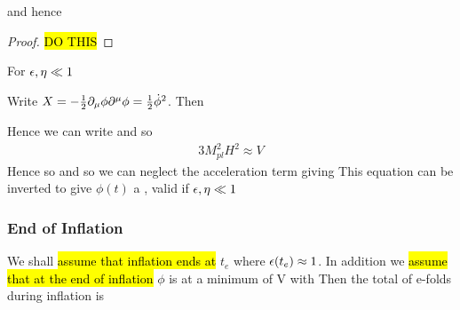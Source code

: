 \documentclass{article}
\begin{document}
\begin{prop}
and hence 
\end{prop}
\begin{proof}
\hl{DO THIS}
\end{proof}

\begin{corollary}
For $\epsilon,\eta \ll 1$
\end{corollary}

\begin{definition}
Write $X = -\frac{1}{2} \partial_\mu \phi \partial^\mu \phi = \frac{1}{2}\dot{\phi}^2$. Then 
\end{definition}

Hence we can write 
and so  
\begin{align}\label{eq:CSM:14}
3 M_{pl}^2 H^2 \approx V 
\end{align}
Hence 
so 
and so we can neglect the acceleration term giving 
This equation can be inverted to give $\phi(t)$ a , valid if $\epsilon,\eta \ll 1$

\subsubsection*{End of Inflation}
We shall \hl{assume that inflation ends at} $t_e$ where $\epsilon(t_e)\approx 1$. In addition we \hl{assume that at the end of inflation} $\phi$ is at a minimum of V with 
Then the total of e-folds during inflation is 
\end{document}
